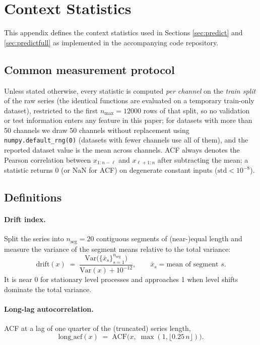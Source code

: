 \section{Context Statistics}
\label{app:stats}

This appendix defines the context statistics used in Sections \ref{sec:predict} and \ref{sec:predictfull} as implemented in the accompanying code repository.

\subsection{Common measurement protocol}

Unless stated otherwise, every statistic is computed \emph{per channel} on the \emph{train split} of the raw series (the identical functions are evaluated on a temporary train-only dataset), restricted to the first $n_{\max} = 12000$ rows of that split, so no validation or test information enters any feature in this paper; for datasets with more than 50 channels we draw 50 channels without replacement using \texttt{numpy.default\_rng(0)} (datasets with fewer channels use all of them), and the reported dataset value is the mean across channels. ACF always denotes the Pearson correlation between $x_{1:n-\ell}$ and $x_{\ell+1:n}$ after subtracting the mean; a statistic returns 0 (or NaN for ACF) on degenerate constant inputs ($\mathrm{std} < 10^{-8}$).

\subsection{Definitions}

\paragraph{Drift index.} Split the series into $n_{\mathrm{seg}} = 20$ contiguous segments of (near-)equal length and measure the variance of the segment means relative to the total variance:
\begin{equation}
\mathrm{drift}(x) \;=\; \frac{\mathrm{Var}\big(\{\bar{x}_s\}_{s=1}^{n_{\mathrm{seg}}}\big)}{\mathrm{Var}(x) + 10^{-12}},
\qquad \bar{x}_s = \text{mean of segment } s .
\end{equation}
It is near 0 for stationary level processes and approaches 1 when level shifts dominate the total variance.

\paragraph{Long-lag autocorrelation.} ACF at a lag of one quarter of the (truncated) series length,
\begin{equation}
\mathrm{long\_acf}(x) \;=\; \mathrm{ACF}\big(x,\; \max(1, \lfloor 0.25\, n \rfloor)\big) .
\end{equation}

